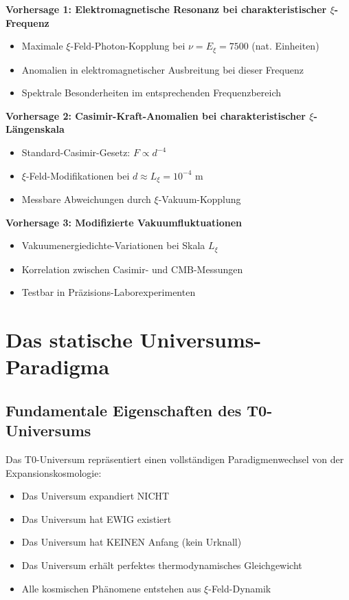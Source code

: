 \documentclass[12pt,a4paper]{article}
\theoremstyle{definition}
\theoremstyle{remark}
\begin{document}
	\textbf{Vorhersage 1: Elektromagnetische Resonanz bei charakteristischer $\xi$-Frequenz}
	\begin{itemize}
		\item Maximale $\xi$-Feld-Photon-Kopplung bei $\nu = E_\xi = 7500$ (nat. Einheiten)
		\item Anomalien in elektromagnetischer Ausbreitung bei dieser Frequenz
		\item Spektrale Besonderheiten im entsprechenden Frequenzbereich
	\end{itemize}
	
	\textbf{Vorhersage 2: Casimir-Kraft-Anomalien bei charakteristischer $\xi$-L\"angenskala}
	\begin{itemize}
		\item Standard-Casimir-Gesetz: $F \propto d^{-4}$
		\item $\xi$-Feld-Modifikationen bei $d \approx L_\xi = 10^{-4}$ m
		\item Messbare Abweichungen durch $\xi$-Vakuum-Kopplung
	\end{itemize}
	
	\textbf{Vorhersage 3: Modifizierte Vakuumfluktuationen}
	\begin{itemize}
		\item Vakuumenergiedichte-Variationen bei Skala $L_\xi$
		\item Korrelation zwischen Casimir- und CMB-Messungen
		\item Testbar in Pr\"azisions-Laborexperimenten
	\end{itemize}
	
	\section{Das statische Universums-Paradigma}
	
	\subsection{Fundamentale Eigenschaften des T0-Universums}
	
	\begin{revolutionary}
		Das T0-Universum repr\"asentiert einen vollst\"andigen Paradigmenwechsel von der Expansionskosmologie:
		\begin{itemize}
			\item Das Universum expandiert NICHT
			\item Das Universum hat EWIG existiert
			\item Das Universum hat KEINEN Anfang (kein Urknall)
			\item Das Universum erh\"alt perfektes thermodynamisches Gleichgewicht
			\item Alle kosmischen Ph\"anomene entstehen aus $\xi$-Feld-Dynamik
		\end{itemize}
	\end{revolutionary}
	
\end{document}
